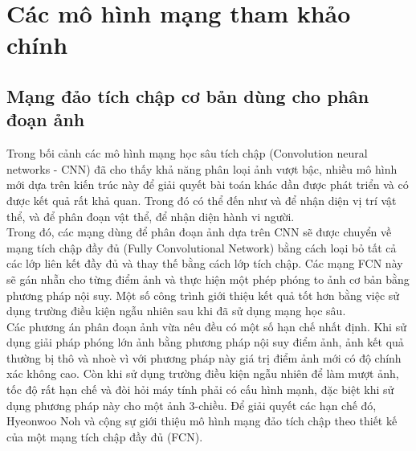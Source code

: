\chapter{Các mô hình mạng tham khảo chính}
\section{Mạng đảo tích chập cơ bản dùng cho phân đoạn ảnh}
Trong bối cảnh các mô hình mạng học sâu tích chập (Convolution neural networks - CNN) đã cho thấy khả năng phân loại ảnh vượt bậc, nhiều mô hình mới dựa trên kiến trúc này để giải quyết bài toán khác dần được phát triển và có được kết quả rất khả quan. Trong đó có thể đến như \cite{object_detection_ex1} và \cite{object_detection_ex2} để nhận diện vị trí vật thể, \cite{segmentation_ex1} và \cite{segmentation_ex2} để phân đoạn vật thể, \cite{action_recognize_ex1} để nhận diện hành vi người.\\
Trong đó, các mạng dùng để phân đoạn ảnh dựa trên CNN sẽ được chuyển về mạng tích chập đầy đủ (Fully Convolutional Network) bằng cách loại bỏ tất cả các lớp liên kết đầy đủ và thay thế bằng cách lớp tích chập. Các mạng FCN này sẽ gán nhẵn cho từng điểm ảnh và thực hiện một phép phóng to ảnh cơ bản bằng phương pháp nội suy. Một số công trình giới thiệu kết quả tốt hơn bằng việc sử dụng trường điều kiện ngẫu nhiên sau khi đã sử dụng mạng học sâu.\\
Các phương án phân đoạn ảnh vừa nêu đều có một số hạn chế nhất định. Khi sử dụng giải pháp phóng lớn ảnh bằng phương pháp nội suy điểm ảnh, ảnh kết quả thường bị thô và nhoè vì với phương pháp này giá trị điểm ảnh mới có độ chính xác không cao. Còn khi sử dụng trường điều kiện ngẫu nhiên để làm mượt ảnh, tốc độ rất hạn chế và đòi hỏi máy tính phải có cấu hình mạnh, đặc biệt khi sử dụng phương pháp này cho một ảnh 3-chiều. Để giải quyết các hạn chế đó, Hyeonwoo Noh và cộng sự giới thiệu mô hình mạng đảo tích chập \cite{unpoolref} theo thiết kế của một mạng tích chập đầy đủ (FCN).

